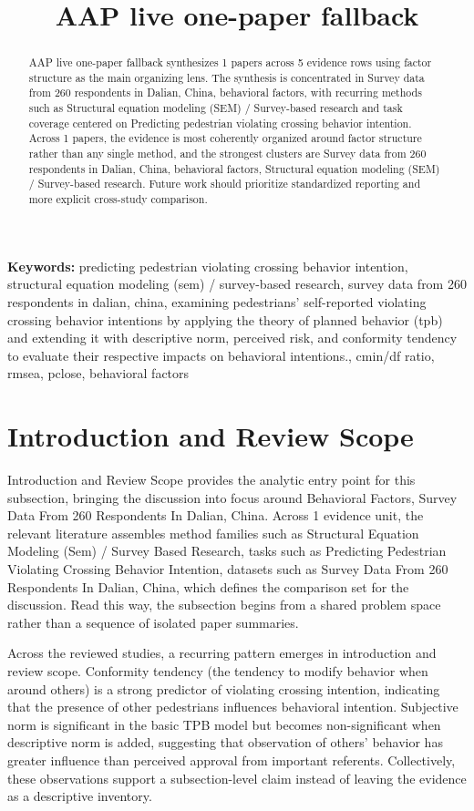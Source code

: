 \documentclass{article}
\title{AAP live one-paper fallback}
\begin{document}
\maketitle
\begin{abstract}
AAP live one-paper fallback synthesizes 1 papers across 5 evidence rows using factor structure as the main organizing lens. The synthesis is concentrated in Survey data from 260 respondents in Dalian, China, behavioral factors, with recurring methods such as Structural equation modeling (SEM) / Survey-based research and task coverage centered on Predicting pedestrian violating crossing behavior intention. Across 1 papers, the evidence is most coherently organized around factor structure rather than any single method, and the strongest clusters are Survey data from 260 respondents in Dalian, China, behavioral factors, Structural equation modeling (SEM) / Survey-based research. Future work should prioritize standardized reporting and more explicit cross-study comparison.
\end{abstract}
\noindent\textbf{Keywords:} predicting pedestrian violating crossing behavior intention, structural equation modeling (sem) / survey-based research, survey data from 260 respondents in dalian, china, examining pedestrians' self-reported violating crossing behavior intentions by applying the theory of planned behavior (tpb) and extending it with descriptive norm, perceived risk, and conformity tendency to evaluate their respective impacts on behavioral intentions., cmin/df ratio, rmsea, pclose, behavioral factors
\section{Introduction and Review Scope}
Introduction and Review Scope provides the analytic entry point for this subsection, bringing the discussion into focus around Behavioral Factors, Survey Data From 260 Respondents In Dalian, China. Across 1 evidence unit, the relevant literature assembles method families such as Structural Equation Modeling (Sem) / Survey Based Research, tasks such as Predicting Pedestrian Violating Crossing Behavior Intention, datasets such as Survey Data From 260 Respondents In Dalian, China, which defines the comparison set for the discussion. Read this way, the subsection begins from a shared problem space rather than a sequence of isolated paper summaries. \cite{08_2016_zhou_aap}

Across the reviewed studies, a recurring pattern emerges in introduction and review scope. Conformity tendency (the tendency to modify behavior when around others) is a strong predictor of violating crossing intention, indicating that the presence of other pedestrians influences behavioral intention. Subjective norm is significant in the basic TPB model but becomes non-significant when descriptive norm is added, suggesting that observation of others' behavior has greater influence than perceived approval from important referents. Collectively, these observations support a subsection-level claim instead of leaving the evidence as a descriptive inventory. \cite{08_2016_zhou_aap}
\end{document}
